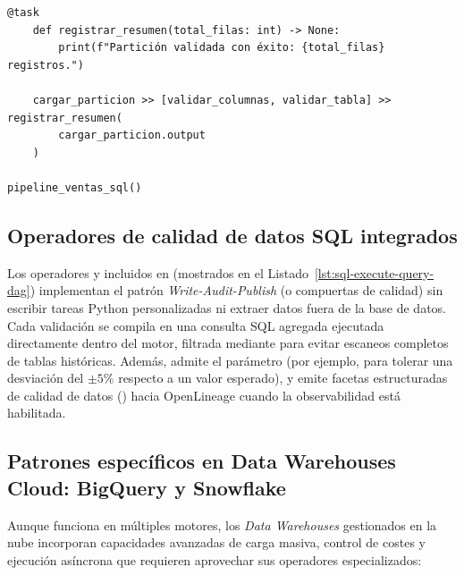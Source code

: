 \begin{lstlisting}[style=python, caption={Uso de \texttt{SQLExecuteQueryOperator} con SQL externo, \texttt{parameters}, \texttt{split\_statements} y \texttt{handler}.}, label={lst:sql-execute-query-dag}]
    @task
    def registrar_resumen(total_filas: int) -> None:
        print(f"Partición validada con éxito: {total_filas} registros.")

    cargar_particion >> [validar_columnas, validar_tabla] >> registrar_resumen(
        cargar_particion.output
    )

pipeline_ventas_sql()
\end{lstlisting}

\subsection{Operadores de calidad de datos SQL integrados}

Los operadores  y  incluidos en  (mostrados en el Listado~\ref{lst:sql-execute-query-dag}) implementan el patrón \textit{Write-Audit-Publish} (o compuertas de calidad) sin escribir tareas Python personalizadas ni extraer datos fuera de la base de datos. Cada validación se compila en una consulta SQL agregada ejecutada directamente dentro del motor, filtrada mediante  para evitar escaneos completos de tablas históricas. Además,  admite el parámetro  (por ejemplo,  para tolerar una desviación del $\pm 5\%$ respecto a un valor esperado), y emite facetas estructuradas de calidad de datos () hacia OpenLineage cuando la observabilidad está habilitada.

\subsection{Patrones específicos en Data Warehouses Cloud: BigQuery y Snowflake}

Aunque  funciona en múltiples motores, los \textit{Data Warehouses} gestionados en la nube incorporan capacidades avanzadas de carga masiva, control de costes y ejecución asíncrona que requieren aprovechar sus operadores especializados:

